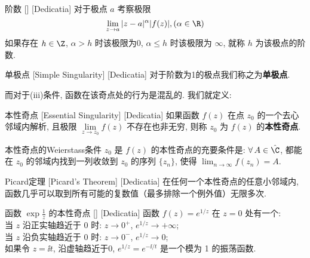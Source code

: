 \documentclass[UTF8]{ctexart}
\begin{document}
        \begin{dfn}
            [UUID]
            {阶数}
            []
            [Dedicatia]
            对于极点 \(a\) 考察极限
            \[\lim_{z\to a}|z-a|^\alpha |f(z)|, (\alpha\in\R)\]
            如果存在 \(h\in\Z\),  \(\alpha>h\) 时该极限为0,  \(\alpha\leq h\) 时该极限为 \(\infty\), 就称 \(h\) 为该极点的阶数. 
        \end{dfn}

        \begin{dfn}
            [SimpleSingularity]
            {单极点}
            [Simple Singularity]
            [Dedicatia]
            对于阶数为1的极点我们称之为\textbf{单极点}. 
        \end{dfn}

        而对于(iii)条件, 函数在该奇点处的行为是混乱的. 我们就定义: 

        \begin{dfn}
            [EssentialSingularity]
            {本性奇点}
            [Essential Singularity]
            [Dedicatia]
            如果函数 \(f(z)\) 在点 \(z_0\) 的一个去心邻域内解析, 且极限 \(\lim\limits_{z \to z_0} f(z)\) 不存在也非无穷, 则称 \(z_0\) 为 \(f(z)\) 的\textbf{本性奇点}. 
        \end{dfn}

        \begin{thm}
            {本性奇点的Weierstass条件}
            \(z_0\) 是 \(f(z)\) 的本性奇点的充要条件是:  \(\forall\,A\in\hat{\C}\), 都能在 \(z_0\) 的邻域内找到一列收敛到 \(z_0\) 的序列 \(\{z_n\}\), 使得 \(\lim_{n\to\infty}f(z_n)=A\).
        \end{thm}

        \begin{thm}
            [UUID]
            {Picard定理}
            [Picard's Theorem]
            [Dedicatia]
            在任何一个本性奇点的任意小邻域内, 函数几乎可以取到所有可能的复数值（最多排除一个例外值）无限多次. 
        \end{thm}

        \begin{xmp}
            [UUID]
            {函数 \(\exp\frac{1}{z}\) 的本性奇点}
            []
            [Dedicatia]
            函数 \(f(z) = e^{1/z}\) 在 \(z=0\) 处有一个\EssentialSingularity :\\
            当 \(z\) 沿正实轴趋近于 0 时: \(z \to 0^+\), \(e^{1/z} \to +\infty\);\\ 
            当 \(z\) 沿负实轴趋近于 0 时: \(z \to 0^-\), \(e^{1/z} \to 0\);\\
            如果令 \(z =\ii t\), 沿虚轴趋近于0, \(e^{1/z} = e^{-\ii/t}\) 是一个模为 1 的振荡函数.
        \end{xmp}
\end{document}

